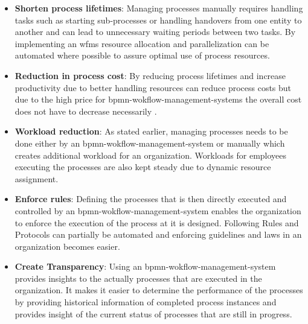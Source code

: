 \begin{itemize}
	\item \textbf{Shorten process lifetimes}: Managing processes manually requires handling tasks such as starting sub-processes or handling handovers from one entity to another and can lead to unnecessary waiting periods between two tasks. By implementing an \gls{wfms} resource allocation and parallelization can be automated where possible to assure optimal use of process resources. \cite{gadatsch2020grundkurs}
	
	\item \textbf{Reduction in process cost}: By reducing process lifetimes and increase productivity due to better handling resources can reduce process costs \cite{gadatsch2020grundkurs} but due to the high price for \gls{bpmn-wokflow-management-system}s the overall cost does not have to decrease necessarily \cite{gruber2009profitability}.
	
	\item \textbf{Workload reduction}: As stated earlier, managing processes needs to be done either by an \gls{bpmn-wokflow-management-system} or manually which creates additional workload for an organization. Workloads for employees executing the processes are also kept steady due to dynamic resource assignment. \cite{fundamentals}\cite{gadatsch2020grundkurs}
	
	\item \textbf{Enforce rules}: Defining the processes that is then directly executed and controlled by an \gls{bpmn-wokflow-management-system} enables the organization to enforce the execution of the process at it is designed. Following Rules and Protocols can partially be automated and enforcing guidelines and laws in an organization becomes easier. \cite{fundamentals}
	
	\item \textbf{Create Transparency}: Using an \gls{bpmn-wokflow-management-system} provides insights to the actually processes that are executed in the organization. It makes it easier to determine the performance of the processes by providing historical information of completed process instances and provides insight of the current status of processes that are still in progress. \cite{gadatsch2020grundkurs}
\end{itemize}

